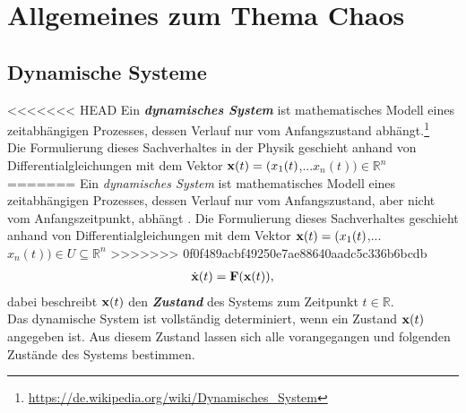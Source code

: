 

\section{Allgemeines zum Thema Chaos}
\label{sec:allgemeines}

\subsection{Dynamische Systeme}
\label{sub:dynamSys}
<<<<<<< HEAD
Ein \textit{\textbf{dynamisches System}} ist mathematisches Modell eines zeitabhängigen Prozesses, dessen Verlauf nur vom Anfangszustand abhängt.\footnote{\url{https://de.wikipedia.org/wiki/Dynamisches_System}}\\
Die Formulierung dieses Sachverhaltes in der Physik geschieht anhand von Differentialgleichungen mit dem Vektor $\boldsymbol{\mathbf{x}}(t)=(x_1(t)$,...$x_n(t))\in\mathbb{R}^n$
=======
Ein \textit{dynamisches System} ist mathematisches Modell eines zeitabhängigen Prozesses, dessen Verlauf nur vom Anfangszustand, aber nicht vom Anfangszeitpunkt, abhängt \citep[vgl.][]{WikiDynSys}. Die Formulierung dieses Sachverhaltes geschieht anhand von Differentialgleichungen mit dem Vektor $\boldsymbol{\mathbf{x}}(t)=(x_1(t)$,...$x_n(t))\in{U}\subseteq\mathbb{R}^n$
>>>>>>> 0f0f489acbf49250e7ae88640aadc5c336b6bcdb
\begin{gather}
    \dot{\boldsymbol{\mathbf{x}}}(t)=\boldsymbol{\mathbf{F}}(\boldsymbol{\mathbf{x}}(t)),
    \label{eq:dynamDGL}
\end{gather}
dabei beschreibt $\boldsymbol{\mathbf{x}}(t)$ den \textit{\textbf{Zustand}} des Systems zum Zeitpunkt $t\in\mathbb{R}$.\\
Das dynamische System ist vollständig determiniert, wenn ein Zustand $\boldsymbol{\mathbf{x}}(t)$ angegeben ist. Aus diesem Zustand lassen sich alle vorangegangen und folgenden Zustände des Systems bestimmen.

